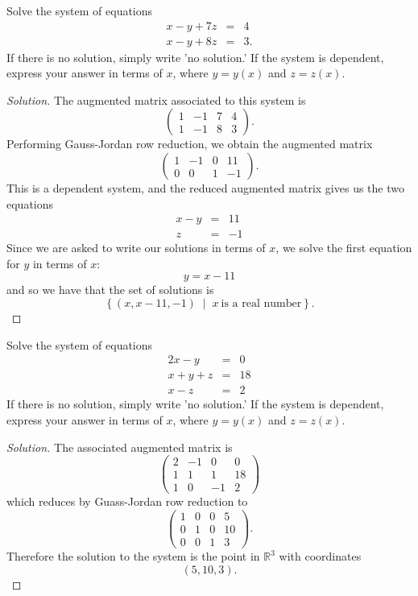 \documentclass[12pt]{amsart}
\begin{document}
\begin{thm}[20 Points]\label{ex3}
  Solve the system of equations
  \begin{eqnarray*}
    x - y + 7z &=& 4\\
    x - y + 8z &=& 3.
  \end{eqnarray*}
  If there is no solution, simply write 'no solution.'  If the system is dependent, express your answer in terms of $x$, where $y = y(x)$ and $z = z(x)$.
  \begin{proof}[Solution]
    The augmented matrix associated to this system is
    $$\left(\begin{array}{cccc}
      1 & -1 & 7 & 4\\
      1 & -1 & 8 & 3
    \end{array}
    \right).$$
    Performing Gauss-Jordan row reduction, we obtain the augmented matrix
    $$\left(\begin{array}{cccc}
      1 & -1 & 0 & 11\\
      0 & 0 & 1 & -1
    \end{array}
    \right).$$
    This is a dependent system, and the reduced augmented matrix gives us the two equations
    \begin{eqnarray*}
      x - y &=& 11\\
      z &=& -1
    \end{eqnarray*}
    Since we are asked to write our solutions in terms of $x$, we solve the first equation for $y$ in terms of $x$:
    $$y = x - 11$$
    and so we have that the set of solutions is
    $$\left\{(x, x - 11, -1)  \;\mid\; x\ \text{is a real number}\right\}.$$
  \end{proof}
\end{thm}

\newpage

\begin{thm}[20 Points]\label{ex4}
  Solve the system of equations
  \begin{eqnarray*}
    2x - y &=& 0\\
    x + y + z &=& 18\\
    x - z &=& 2
  \end{eqnarray*}
  If there is no solution, simply write 'no solution.'  If the system is dependent, express your answer in terms of $x$, where $y = y(x)$ and $z = z(x)$.
  \begin{proof}[Solution]
    The associated augmented matrix is
    $$\left(\begin{array}{cccc}
      2 & -1 & 0 & 0\\
      1 & 1 & 1 & 18\\
      1 & 0 & -1 & 2
    \end{array}\right)$$
    which reduces by Guass-Jordan row reduction to
    $$\left(\begin{array}{cccc}
      1 & 0 & 0 & 5\\
      0 & 1 & 0 & 10\\
      0 & 0 & 1 & 3
    \end{array}\right).$$
    Therefore the solution to the system is the point in $\mathbb{R}^3$ with coordinates
    $$(5,10,3).$$
  \end{proof}
\end{thm}
\end{document}

